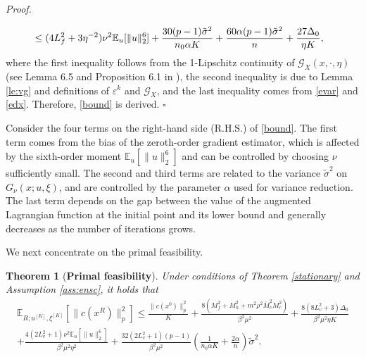 \documentclass[11pt]{article}
\newtheorem{theorem}{Theorem}[section]
\newenvironment{proof}[1][Proof]{%
    \par\noindent\textit{#1.}\enspace
  }{%
    \hfill\ensuremath{\square}\par
  }%
\numberwithin{equation}{section}
\def\red#1{\textcolor{red}{#1}}
\newcommand{\E}{\mathbb{E}}
\newcommand{\be}{\begin{equation}}
\newcommand{\ee}{\end{equation}}
\begin{document}
\begin{proof}
\begin{align}
         &\leq(4L_f^2+3\eta^{-2})\nu^2 \E_u[\|u\|_2^6] +\frac{30(p-1)\tilde \sigma^2}{n_0 \alpha K}+\frac{60\alpha (p -1)\tilde \sigma^2}{n} +\frac{27 \Delta_0}{ \eta K}, \notag
    \end{align}
    where the first inequality follows from the 1-Lipschitz continuity of $\mathcal{G}_X(x,\cdot,\eta)$ (see Lemma 6.5 and Proposition 6.1 in \cite{lan2020first}), the second inequality is due to Lemma  \ref{le:vg} and definitions of $\varepsilon^k$ and $\mathcal{G}_X$, {and the last inequality comes from \eqref{evar} and \eqref{edx}}. 
Therefore, \eqref{bound} is derived. 
\end{proof}

Consider the four terms on the right-hand side (R.H.S.) of \eqref{bound}. The first term comes from the bias of the zeroth-order gradient estimator, which is affected by the sixth-order moment \(\E_u[\|u\|_2^6]\) and can be controlled by choosing $\nu$  sufficiently small. The second and third terms are related to the variance $\tilde \sigma^2$ on \(G_\nu(x;u,\xi)\), and are controlled by the parameter $\alpha$ used for variance reduction. The last term depends on the gap between the value of the augmented Lagrangian function at the initial point and its lower bound and  generally decreases as the number of iterations grows.

We next concentrate on the primal feasibility.  

\begin{theorem}[{\bf {Primal feasibility}}]\label{th:3eKKT}
    Under conditions of Theorem \ref{stationary} and Assumption \ref{ass:ensc}, 
    it holds that
    \be\label{bound-fea}\begin{aligned}
\mathbb{E}_{R;u^{[K]},\xi^{[K]}} [  \|  c ( x^R  )  \|_p^2]  
        \leq \frac{\|c(x^0)\|_p^2}{K} + \frac{8(M_f^2+M_h^2+m^2\rho^2\bar{M}_c^2M_c^2)}{\beta^2 \mu^2 }
        +\frac{8(8L_v^2+3)\Delta_0}{\beta^2\mu^2\eta K}\\+\frac{4(2L_v^2+1)\nu^2\E_u[\|u\|_2^6]}{\beta^2\mu^2\eta^2} +\frac{32(2L_v^2+1)(p-1)}{\beta^2\mu^2}(\frac{1}{n_0 \alpha K} + \frac{2\alpha}{n})\tilde \sigma^2.
    \end{aligned}\ee

\end{theorem}
\end{document}
